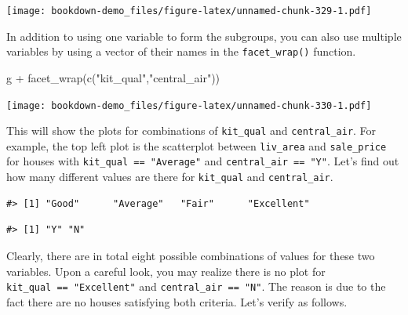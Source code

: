 \documentclass[
]{book}
\newenvironment{Shaded}{\begin{snugshade}}{\end{snugshade}}
\newcommand{\FunctionTok}[1]{\textcolor[rgb]{0.00,0.00,0.00}{#1}}
\newcommand{\NormalTok}[1]{#1}
\newcommand{\SpecialCharTok}[1]{\textcolor[rgb]{0.00,0.00,0.00}{#1}}
\newcommand{\StringTok}[1]{\textcolor[rgb]{0.31,0.60,0.02}{#1}}
\begin{document}
\texttt{[image: bookdown-demo\_files/figure-latex/unnamed-chunk-329-1.pdf]}

In addition to using one variable to form the subgroups, you can also use multiple variables by using a vector of their names in the \texttt{facet\_wrap()} function.

\begin{Shaded}
\begin{Highlighting}[]
\NormalTok{g }\SpecialCharTok{+} \FunctionTok{facet\_wrap}\NormalTok{(}\FunctionTok{c}\NormalTok{(}\StringTok{"kit\_qual"}\NormalTok{,}\StringTok{"central\_air"}\NormalTok{))}
\end{Highlighting}
\end{Shaded}

\texttt{[image: bookdown-demo\_files/figure-latex/unnamed-chunk-330-1.pdf]}

This will show the plots for combinations of \texttt{kit\_qual} and \texttt{central\_air}. For example, the top left plot is the scatterplot between \texttt{liv\_area} and \texttt{sale\_price} for houses with \texttt{kit\_qual\ ==\ "Average"} and \texttt{central\_air\ ==\ "Y"}. Let's find out how many different values are there for \texttt{kit\_qual} and \texttt{central\_air}.

\begin{Shaded}
\end{Shaded}

\begin{verbatim}
#> [1] "Good"      "Average"   "Fair"      "Excellent"
\end{verbatim}

\begin{Shaded}
\end{Shaded}

\begin{verbatim}
#> [1] "Y" "N"
\end{verbatim}

Clearly, there are in total eight possible combinations of values for these two variables. Upon a careful look, you may realize there is no plot for \texttt{kit\_qual\ ==\ "Excellent"} and \texttt{central\_air\ ==\ "N"}. The reason is due to the fact there are no houses satisfying both criteria. Let's verify as follows.
\end{document}
